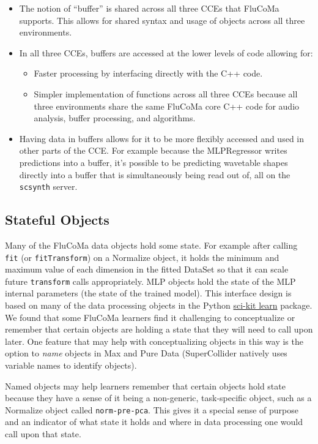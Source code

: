 \documentclass{article}
\providecommand{\tightlist}{%
  \setlength{\itemsep}{0pt}\setlength{\parskip}{0pt}}
\begin{document}
\begin{itemize}
\tightlist
\item
  The notion of ``buffer'' is shared across all three CCEs that FluCoMa
  supports. This allows for shared syntax and usage of objects across
  all three environments.
\item
  In all three CCEs, buffers are accessed at the lower levels of code
  allowing for:

  \begin{itemize}
  \tightlist
  \item
    Faster processing by interfacing directly with the C++ code.
  \item
    Simpler implementation of functions across all three CCEs because
    all three environments share the same FluCoMa core C++ code for
    audio analysis, buffer processing, and algorithms.
  \end{itemize}
\item
  Having data in buffers allows for it to be more flexibly accessed and
  used in other parts of the CCE. For example because the MLPRegressor
  writes predictions into a buffer, it's possible to be predicting
  wavetable shapes directly into a
  buffer that is simultaneously being read out of, all on the \texttt{scsynth} server.
\end{itemize}

\subsection{Stateful Objects}\label{stateful-objects}

Many of the FluCoMa data objects hold some state. For example after
calling \texttt{fit} (or \texttt{fitTransform}) on a Normalize object,
it holds the minimum and maximum value of each dimension in the fitted
DataSet so that it can scale future \texttt{transform} calls
appropriately. MLP objects hold the state of the MLP internal parameters
(the state of the trained model). This interface design is based on many
of the data processing objects in the Python
\href{https://scikit-learn.org/stable/}{sci-kit learn} package. We found
that some FluCoMa learners find it challenging to conceptualize or
remember that certain objects are holding a state that they will need to
call upon later. One feature that may help with conceptualizing objects
in this way is the option to \emph{name} objects in Max and Pure Data
(SuperCollider natively uses variable names to identify objects).

Named objects may help learners remember that certain objects hold state
because they have a sense of it being a non-generic, task-specific
object, such as a Normalize object called \texttt{norm-pre-pca}. This gives
it a special sense of purpose and an indicator of what state it holds
and where in data processing one would call upon that state.
\end{document}

